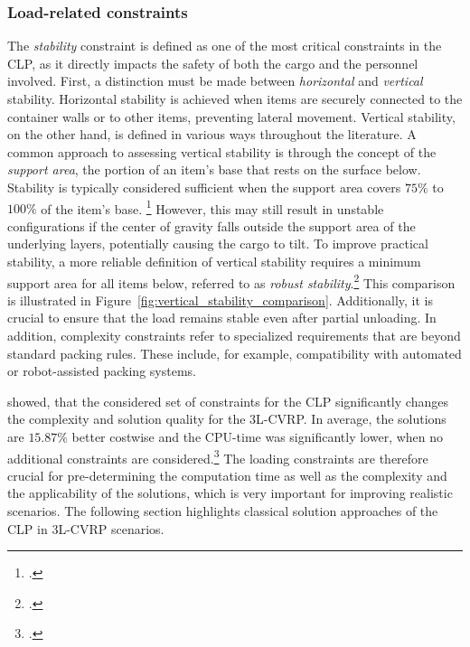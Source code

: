 \subsubsection{Load-related constraints}

The \textit{stability} constraint is defined as one of the most critical constraints
in the \gls{CLP}, as it directly impacts the safety of both the cargo and the personnel involved.
First, a distinction must be made between \textit{horizontal} and \textit{vertical} stability.
Horizontal stability is achieved when items are securely connected to the
container walls or to other items, preventing lateral movement. Vertical
stability, on the other hand, is defined in various ways throughout the
literature. A common approach to assessing vertical stability is through the concept of the \textit{support
    area}, the portion of an item's base that rests on the surface below. Stability is typically
considered sufficient when the support area covers $75\%$ to $100\%$ of the item’s base. \footcite[cf.][p. 344]{gendreau_tabu_2006} However,
this may still result in unstable configurations if the center of gravity falls outside the
support area of the underlying layers, potentially causing the cargo to tilt. To improve practical stability,
a more reliable definition of vertical stability requires a minimum support area for all items below,
referred to as \textit{robust stability}.\footcite[cf.][p. 1140]{ceschia_local_2013} This comparison is illustrated in Figure~\ref{fig:vertical_stability_comparison}.
Additionally, it is crucial to ensure that the load remains stable even after partial unloading.
In addition, complexity constraints refer to specialized
requirements that are beyond standard packing rules. These include, for example, compatibility with automated or robot-assisted packing systems.


\cite{gendreau_tabu_2006} showed, that the considered set of constraints for the \gls{CLP} significantly
changes the complexity and solution quality for the \gls{3L-CVRP}. In average, the solutions are $15.87\%$ better
costwise and the CPU-time was significantly lower, when no additional constraints are considered.\footcite[cf.][p.348]{gendreau_tabu_2006}
The loading constraints are therefore crucial for pre-determining the computation time as well as the complexity and the applicability
of the solutions, which is very important for improving realistic scenarios.
The following section highlights classical solution approaches of the \gls{CLP} in \gls{3L-CVRP} scenarios.


